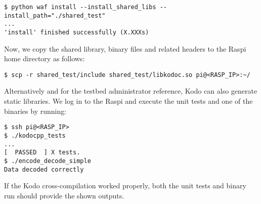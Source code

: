 \begin{lstlisting}[]
$ python waf install --install_shared_libs --install_path="./shared_test"
...
'install' finished successfully (X.XXXs)
\end{lstlisting}
\FloatBarrier
\vspace{-5mm}

Now, we copy the shared library, binary files and related headers to the
\ac{Raspi} home directory as follows:

\begin{lstlisting}[]
$ scp -r shared_test/include shared_test/libkodoc.so pi@<RASP_IP>:~/
\end{lstlisting}
\FloatBarrier
\vspace{-5mm}

Alternatively and for the testbed administrator reference, Kodo can also
generate static libraries. We log in to the \ac{Raspi} and execute the unit
tests and one of the binaries by running:

\begin{lstlisting}[]
$ ssh pi@<RASP_IP>
$ ./kodocpp_tests
...
[  PASSED  ] X tests.
$ ./encode_decode_simple
Data decoded correctly
\end{lstlisting}
\FloatBarrier
\vspace{-5mm}

If the Kodo cross-compilation worked properly, both the unit tests and
binary run should provide the shown outputs.

